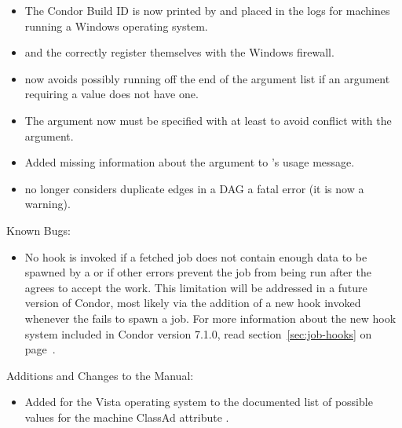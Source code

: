 \begin{itemize}

\item The Condor Build ID is now printed by  and placed 
  in the logs for machines running a Windows operating system.

\item {} and the  correctly register 
  themselves with the Windows firewall.

\item {} now avoids possibly running off the end
of the argument list if an argument requiring a value does not have one.

\item The   argument now must be
specified with at least  to avoid conflict with the
 argument.

\item Added missing information about the  argument to
's usage message.

\item {} no longer considers duplicate edges in a DAG a
fatal error (it is now a warning).

\end{itemize}

\noindent Known Bugs:

\begin{itemize}

\item No hook is invoked if a fetched job does not contain enough data
  to be spawned by a  or if other errors prevent the
  job from being run after the  agrees to accept the
  work.
  This limitation will be addressed in a future version of Condor,
  most likely via the addition of a new hook invoked whenever the
   fails to spawn a job.
  For more information about the new hook system included in Condor
  version 7.1.0, read section~\ref{sec:job-hooks} on
  page~\pageref{sec:job-hooks}.

\end{itemize}

\noindent Additions and Changes to the Manual:

\begin{itemize}

\item Added  for the Vista operating system to
  the documented list of possible values for the machine ClassAd
  attribute .

\end{itemize}

